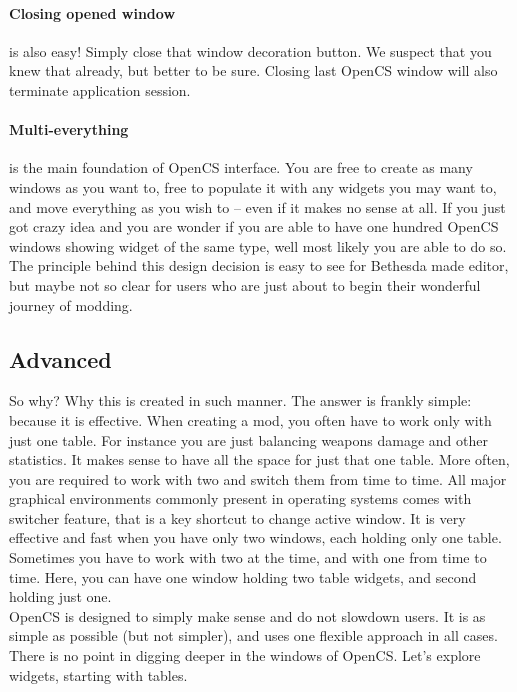 \paragraph{Closing opened window}
is also easy! Simply close that window decoration button. We suspect that you knew that already, but better to be sure. Closing last Open{CS} window will also terminate application session.

\paragraph{Multi-everything}
is the main foundation of Open{CS} interface. You are free to create as many windows as you want to, free to populate it with any widgets you may want to, and move everything as you wish to -- even if it makes no sense at all. If you just got crazy idea and you are wonder if you are able to have one hundred Open{CS} windows showing widget of the same type, well most likely you are able to do so.\\

The principle behind this design decision is easy to see for Bethesda made editor, but maybe not so clear for users who are just about to begin their wonderful journey of modding.\\

\subsection{Advanced}
So why? Why this is created in such manner. The answer is frankly simple: because it is effective. When creating a mod, you often have to work only with just one table. For instance you are just balancing weapons damage and other statistics. It makes sense to have all the space for just that one table. More often, you are required to work with two and switch them from time to time. All major graphical environments commonly present in operating systems comes with switcher feature, that is a key shortcut to change active window. It is very effective and fast when you have only two windows, each holding only one table. Sometimes you have to work with two at the time, and with one from time to time. Here, you can have one window holding two table widgets, and second holding just one.\\

Open{CS} is designed to simply make sense and do not slowdown users. It is as simple as possible (but not simpler), and uses one flexible approach in all cases.\\

There is no point in digging deeper in the windows of Open{CS}. Let's explore widgets, starting with tables.
